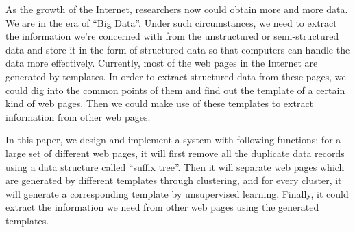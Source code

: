 
\begin{eabstract} 
  As the growth of the Internet, researchers now could obtain more and more
  data. We are in the era of ``Big Data''. Under such circumstances, we need to
  extract the information we're concerned with from the unstructured or
  semi-structured data and store it in the form of structured data so that
  computers can handle the data more effectively. Currently, most of the web
  pages in the Internet are generated by templates. In order to extract
  structured data from these pages, we could dig into the common points of them
  and find out the template of a certain kind of web pages. Then we could make
  use of these templates to extract information from other web pages.

  In this paper, we design and implement a system with following functions: for
  a large set of different web pages, it will first remove all the duplicate
  data records using a data structure called ``suffix tree''. Then it will
  separate web pages which are generated by different templates through
  clustering, and for every cluster, it will generate a corresponding template
  by unsupervised learning. Finally, it could extract the information we need
  from other web pages using the generated templates.
\end{eabstract}


